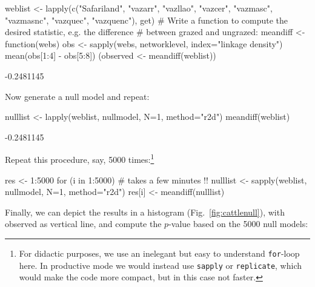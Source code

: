 \documentclass[a4paper, 11pt]{article}\usepackage[]{graphicx}\usepackage[]{color}
\begin{document}
\begin{Schunk}
\begin{Sinput}
weblist <- lapply(c("Safariland", "vazarr", "vazllao", "vazcer", "vazmasc", 
                       "vazmasnc", "vazquec", "vazquenc"), get)
# Write a function to compute the desired statistic, e.g. the difference 
# between grazed and ungrazed:
meandiff <- function(webs){
   obs <- sapply(webs, networklevel, index="linkage density")  
   mean(obs[1:4] - obs[5:8])
}
(observed <- meandiff(weblist))
\end{Sinput}
\begin{Soutput}
[1] -0.2481145
\end{Soutput}
\end{Schunk}
Now generate a null model and repeat:
\begin{Schunk}
\begin{Sinput}
nulllist <- lapply(weblist, nullmodel, N=1, method="r2d")
meandiff(weblist)
\end{Sinput}
\begin{Soutput}
[1] -0.2481145
\end{Soutput}
\end{Schunk}
Repeat this procedure, say, 5000 times:\footnote{For didactic purposes, we use an inelegant but easy to understand \texttt{for}-loop here. In productive mode we would instead use \texttt{sapply} or \texttt{replicate}, which would make the code more compact, but in this case not faster.}
\begin{Schunk}
\begin{Sinput}
res <- 1:5000
for (i in 1:5000){ # takes a few minutes !!
   nulllist <- sapply(weblist, nullmodel, N=1, method="r2d")
   res[i] <- meandiff(nulllist)  
}
\end{Sinput}
\end{Schunk}
Finally, we can depict the results in a histogram (Fig.~\ref{fig:cattlenull}), with observed as vertical line, and compute the $p$-value based on the 5000 null models:
%
\end{document}
